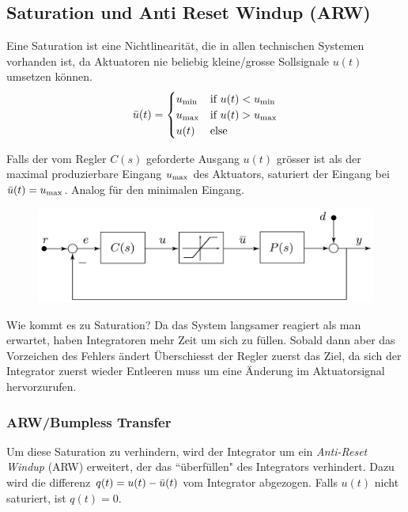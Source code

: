 \subsection{Saturation und Anti Reset Windup (ARW)}
    Eine Saturation ist eine Nichtlinearität, die in allen technischen Systemen vorhanden ist, da Aktuatoren nie beliebig kleine/grosse Sollsignale $u(t)$ umsetzen können.
    \begin{equation*}
        \Bar{u}(t) = 
        \begin{cases}
        u_\textnormal{min}   &\textnormal{if } u(t) < u_{\textnormal{min}}\\
        u_\textnormal{max}   &\textnormal{if } u(t) > u_{\textnormal{max}}\\
        u(t)    &\textnormal{else}
        \end{cases}
    \end{equation*}
    
    Falls der vom Regler $C(s)$ geforderte Ausgang $u(t)$ grösser ist als der maximal produzierbare Eingang $u_{\textnormal{max}}$ des Aktuators, saturiert der Eingang bei $\Bar{u}(t) = u_{\textnormal{max}}$. Analog für den minimalen Eingang.
    
    \begin{figure}[H]
        \centering
        \includegraphics[width = 0.6\linewidth]{images/04/arw.jpeg}
    \end{figure}
    
    Wie kommt es zu Saturation? Da das System langsamer reagiert als man erwartet, haben Integratoren mehr Zeit um sich zu füllen. Sobald dann aber das Vorzeichen des Fehlers ändert Überschiesst der Regler zuerst das Ziel, da sich der Integrator zuerst wieder Entleeren muss um eine Änderung im Aktuatorsignal hervorzurufen. 
    
    \subsubsection{ARW/Bumpless Transfer}
        Um diese Saturation zu verhindern, wird der Integrator um ein \textit{Anti-Reset Windup} (ARW) erweitert, der das ``überfüllen" des Integrators verhindert. Dazu wird die differenz $q(t) = u(t) - \Bar{u}(t)$ vom Integrator abgezogen. Falls $u(t)$ nicht saturiert, ist $q(t)= 0$.
        
